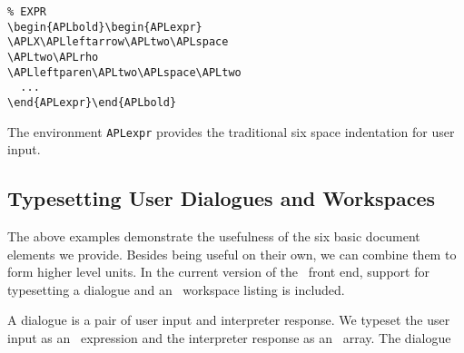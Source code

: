 \begin{verbatim}
% EXPR
\begin{APLbold}\begin{APLexpr}
\APLX\APLleftarrow\APLtwo\APLspace
\APLtwo\APLrho
\APLleftparen\APLtwo\APLspace\APLtwo
  ...
\end{APLexpr}\end{APLbold}
\end{verbatim}
%
 
The environment {\tt APLexpr} provides
the traditional six space indentation for user input.
 
\subsection{Typesetting User Dialogues and Workspaces}
 
The above examples demonstrate the usefulness of the six basic
document elements we provide. Besides being useful on their own, we
can combine them to form higher level units. In the current version
of the \APL\ front end, support for typesetting a dialogue
and an \APL\ workspace listing is included.
 
A dialogue is a pair of user input and interpreter
response. We typeset the user input as an \APL\ expression and the
interpreter response as an \APL\ array. The dialogue
 
{\parsep=0pt %
\begin{APLbold}\begin{APLexpr}
\APLleftparen\APLone\APLleftparen\APLtwo\APLspace
\APLthree\APLrightparen\APLfour
\end{APLexpr}\end{APLbold}
\begin{APLarray}
\APLmb{\APLS}\APLmb{\APLY}\APLmb{\APLN}\APLmb{\APLT}\APLmb{
\APLA}\APLmb{\APLX}\APLmb{\APLspace}\APLmb{\APLE}\APLmb{\APLR}
\APLmb{\APLR}\APLmb{\APLO}\APLmb{\APLR}
\APLspace\par
\APLmb{\APLspace}\APLmb{\APLspace}\APLmb{\APLspace}\APLmb{
\APLspace}\APLmb{\APLspace}\APLmb{\APLspace}\APLmb{
\APLleftparen}\APLmb{\APLone}\APLmb{\APLleftparen}\APLmb{\APLtwo}\APLmb{
\APLspace}\APLmb{\APLthree}\APLmb{\APLrightparen}\APLmb{\APLfour}
\APLspace\par
\APLmb{\APLspace}\APLmb{\APLspace}\APLmb{\APLspace}\APLmb{
\APLspace}\APLmb{\APLspace}\APLmb{\APLspace}\APLmb{\APLupcaret}
\APLspace\par
\end{APLarray}
}           %
 
